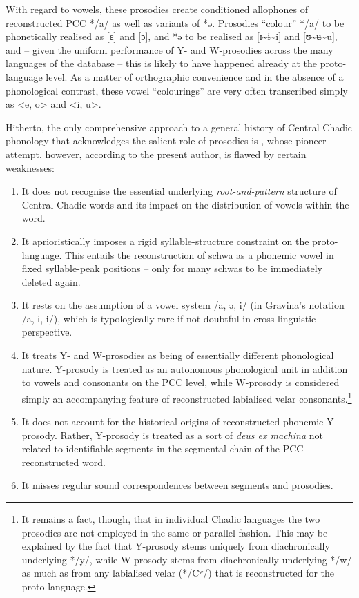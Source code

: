 \documentclass[output=paper]{langscibook}
\begin{document}
With regard to vowels, these prosodies create conditioned allophones of reconstructed PCC */a/ as well as variants of *ə. Prosodies ``colour'' */a/ to be phonetically realised as [ε] and [ɔ], and *ə to be realised as [ɪ{\textasciitilde}ɨ{\textasciitilde}i] and [ʊ{\textasciitilde}ʉ{\textasciitilde}u], and – given the uniform performance of Y- and W-prosodies across the many languages of the database – this is likely to have happened already at the proto-language level. As a matter of orthographic convenience and in the absence of a phonological contrast, these vowel ``colourings'' are very often transcribed simply as <e, o> and <i, u>.

Hitherto, the only comprehensive approach to a general history of Central Chadic phonology that acknowledges the salient role of prosodies is \citet{Gravina2014}, whose pioneer attempt, however, according to the present author, is flawed by certain weaknesses: 

\begin{enumerate}
\item It does not recognise the essential underlying \textit{root-and-pattern} structure of Central Chadic words and its impact on the distribution of vowels within the word. 
\item It aprioristically imposes a rigid syllable-structure constraint on the proto-language. This entails the reconstruction of schwa as a phonemic vowel in fixed syllable-peak positions – only for many schwas to be immediately deleted again. 
\item It rests on the assumption of a vowel system /a, ə, i/ (in Gravina’s notation /a, ɨ, i/), which is typologically rare if not doubtful in cross-linguistic perspective. 
\item It treats Y- and W-prosodies as being of essentially different phonological nature. Y-prosody is treated as an autonomous phonological unit in addition to vowels and consonants on the PCC level, while W-prosody is considered simply an accompanying feature of reconstructed labialised velar consonants.\footnote{It remains a fact, though, that in individual Chadic languages the two prosodies are not employed in the same or parallel fashion. This may be explained by the fact that Y-prosody stems uniquely from diachronically underlying */y/, while W-prosody stems from diachronically underlying */w/ as much as from any labialised velar (*/Cʷ/) that is reconstructed for the proto-language.} 
\item It does not account for the historical origins of reconstructed phonemic Y-prosody. Rather, Y-prosody is treated as a sort of \textit{deus ex machina} not related to identifiable segments in the segmental chain of the PCC reconstructed word.
\item It misses regular sound correspondences between segments and prosodies.
\end{enumerate}
\end{document}
